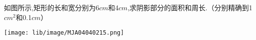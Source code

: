 如图所示,矩形的长和宽分别为6$cm$和4$cm$,求阴影部分的面积和周长.（分别精确到1$cm^2$和0.1$cm$）

\begin{flushright}

    \texttt{[image: lib/image/MJA04040215.png]}

\end{flushright}



